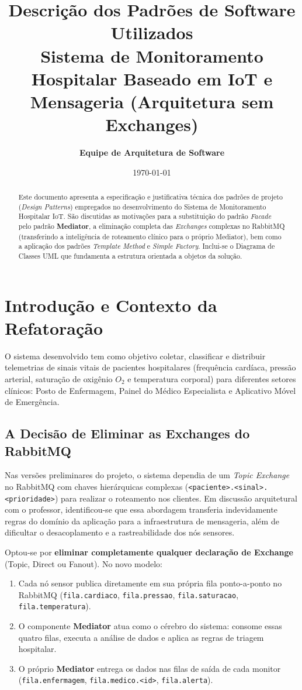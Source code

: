 \documentclass[12pt,a4paper]{article}
\title{\textbf{Descrição dos Padrões de Software Utilizados}\\
\large Sistema de Monitoramento Hospitalar Baseado em IoT e Mensageria (Arquitetura sem Exchanges)}
\author{\textbf{Equipe de Arquitetura de Software}}
\date{\today}
\begin{document}
\maketitle

\begin{abstract}
Este documento apresenta a especificação e justificativa técnica dos padrões de projeto (\textit{Design Patterns}) empregados no desenvolvimento do Sistema de Monitoramento Hospitalar IoT. São discutidas as motivações para a substituição do padrão \textit{Facade} pelo padrão \textbf{Mediator}, a eliminação completa das \textit{Exchanges} complexas no RabbitMQ (transferindo a inteligência de roteamento clínico para o próprio Mediator), bem como a aplicação dos padrões \textit{Template Method} e \textit{Simple Factory}. Inclui-se o Diagrama de Classes UML que fundamenta a estrutura orientada a objetos da solução.
\end{abstract}

\tableofcontents
\newpage

\section{Introdução e Contexto da Refatoração}
O sistema desenvolvido tem como objetivo coletar, classificar e distribuir telemetrias de sinais vitais de pacientes hospitalares (frequência cardíaca, pressão arterial, saturação de oxigênio $O_2$ e temperatura corporal) para diferentes setores clínicos: Posto de Enfermagem, Painel do Médico Especialista e Aplicativo Móvel de Emergência.

\subsection{A Decisão de Eliminar as Exchanges do RabbitMQ}
Nas versões preliminares do projeto, o sistema dependia de um \textit{Topic Exchange} no RabbitMQ com chaves hierárquicas complexas (\texttt{<paciente>.<sinal>.<prioridade>}) para realizar o roteamento nos clientes. Em discussão arquitetural com o professor, identificou-se que essa abordagem transferia indevidamente regras do domínio da aplicação para a infraestrutura de mensageria, além de dificultar o desacoplamento e a rastreabilidade dos nós sensores.

Optou-se por \textbf{eliminar completamente qualquer declaração de Exchange} (Topic, Direct ou Fanout). No novo modelo:
\begin{enumerate}
    \item Cada nó sensor publica diretamente em sua própria fila ponto-a-ponto no RabbitMQ (\texttt{fila.cardiaco}, \texttt{fila.pressao}, \texttt{fila.saturacao}, \texttt{fila.temperatura}).
    \item O componente \textbf{Mediator} atua como o cérebro do sistema: consome essas quatro filas, executa a análise de dados e aplica as regras de triagem hospitalar.
    \item O próprio \textbf{Mediator} entrega os dados nas filas de saída de cada monitor (\texttt{fila.enfermagem}, \texttt{fila.medico.<id>}, \texttt{fila.alerta}).
\end{enumerate}
\end{document}
